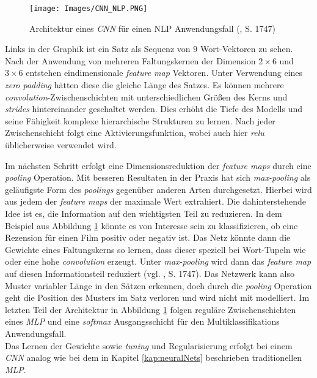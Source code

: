 \documentclass[a4paper,11pt]{article}
\begin{document}
\begin{figure}[!ht]
\begin{center}
\texttt{[image: Images/CNN\_NLP.PNG]}
\caption{Architektur eines \textit{CNN} für einen NLP Anwendungsfall (\cite{cnnSentence}, S. 1747)}
\label{abb:CNN_NLP}
\end{center}
\end{figure}

Links in der Graphik ist ein Satz als Sequenz von $9$ Wort-Vektoren zu sehen. Nach der Anwendung von mehreren Faltungskernen der Dimension $2 \times 6$ und $3 \times 6$ entstehen eindimensionale \textit{feature map} Vektoren. Unter Verwendung eines \textit{zero padding} hätten diese die gleiche Länge des Satzes. Es können mehrere \textit{convolution}-Zwischenschichten mit unterschiedlichen Größen des Kerns und \textit{strides} hintereinander geschaltet werden. Dies erhöht die Tiefe des Modells und seine Fähigkeit komplexe hierarchische Strukturen zu lernen. Nach jeder Zwischenschicht folgt eine Aktivierungsfunktion, wobei auch hier \textit{relu} üblicherweise verwendet wird.

Im nächsten Schritt erfolgt eine Dimensionsreduktion der \textit{feature maps} durch eine \textit{pooling} Operation. Mit besseren Resultaten in der Praxis hat sich \textit{max-pooling} als geläufigste Form des \textit{poolings} gegenüber anderen Arten durchgesetzt. Hierbei wird aus jedem der \textit{feature maps} der maximale Wert extrahiert. Die dahinterstehende Idee ist es, die Information auf den wichtigsten Teil zu reduzieren. In dem Beispiel aus Abbildung \ref{abb:CNN_NLP} könnte es von Interesse sein zu klassifizieren, ob eine Rezension für einen Film positiv oder negativ ist. Das Netz könnte dann die Gewichte eines Faltungskerns so lernen, dass dieser speziell bei Wort-Tupeln wie  oder  eine hohe \textit{convolution} erzeugt. Unter \textit{max-pooling} wird dann das \textit{feature map} auf diesen Informationsteil reduziert (vgl. \cite{cnnSentence}, S. 1747). Das Netzwerk kann also Muster variabler Länge in den Sätzen erkennen, doch durch die \textit{pooling} Operation geht die Position des Musters im Satz verloren und wird nicht mit modelliert.
Im letzten Teil der Architektur in Abbildung \ref{abb:CNN_NLP} folgen reguläre Zwischenschichten eines \textit{MLP} und eine \textit{softmax} Ausgangsschicht für den Multiklassifikations Anwendungsfall.\\
Das Lernen der Gewichte sowie \textit{tuning} und Regularisierung erfolgt bei einem \textit{CNN} analog wie bei dem in Kapitel \ref{kap:neuralNets} beschrieben traditionellen \textit{MLP}.
\end{document}
